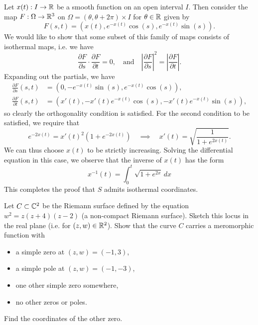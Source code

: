 \documentclass[expanded]{lkx_pset}
\begin{document}
\begin{parts}
	Let $x(t) : I \to \mathbb{R}$ be a smooth function on an open interval $I$. Then consider the map $F : \Omega \to \mathbb{R}^3$ on $\Omega=(\theta,\theta+2\pi)\times I$ for $\theta\in \mathbb{R}$ given by
	\[
		F(s,t)=(x(t), e^{-x(t)}\cos(s), e^{-x(t)}\sin(s)).
	\]
	We would like to show that some subset of this family of maps consists of isothermal maps, i.e. we have
	\[
		\frac{\partial F}{\partial s}\cdot \frac{\partial F}{\partial t} = 0,\quad \textrm{and}\quad \left|\frac{\partial F}{\partial s}\right|^2=\left|\frac{\partial F}{\partial t}\right|.
	\]
	Expanding out the partials, we have
	\[
		\begin{aligned}
			\frac{\partial F}{\partial s}(s,t) & = (0, -e^{-x(t)}\sin(s), e^{-x(t)}\cos(s)),                \\
			\frac{\partial F}{\partial t}(s,t) & = (x'(t), -x'(t)e^{-x(t)}\cos(s), -x'(t)e^{-x(t)}\sin(s)),
		\end{aligned}
	\]
	so clearly the orthogonality condition is satisfied. For the second condition to be satisfied, we require that
	\[
		e^{-2x(t)} = x'(t)^2(1+e^{-2x(t)}) \quad\implies\quad x'(t) = \sqrt{\frac{1}{1+e^{2x(t)}}}.
	\]
	We can thus choose $x(t)$ to be strictly increasing. Solving the differential equation in this case, we observe that the inverse of $x(t)$ has the form
	\[
		x^{-1}(t) = \int_0^t \sqrt{1+e^{2x}}\,dx
	\]
	This completes the proof that $S$ admits isothermal coordinates.
\end{parts}

\begin{problem}{5}
Let $C\subset \mathbb{C}^{2}$ be the Riemann surface defined by the
equation $w^{2}=z(z+4)(z-2)$ (a non-compact Riemann surface).
Sketch this locus in the real plane (i.e. for $(z,w) \in \mathbb{R}^{2}$).
Show that the curve $C$ carries a meromorphic function with
\begin{itemize}
	\item a simple zero at $(z,w)=(-1,3)$,
	\item a simple pole at
	      $(z,w)=(-1,-3)$,
	\item one other simple zero somewhere,
	\item no other zeros or poles.
\end{itemize}
Find the coordinates of the other zero.

\end{problem}
\end{document}
